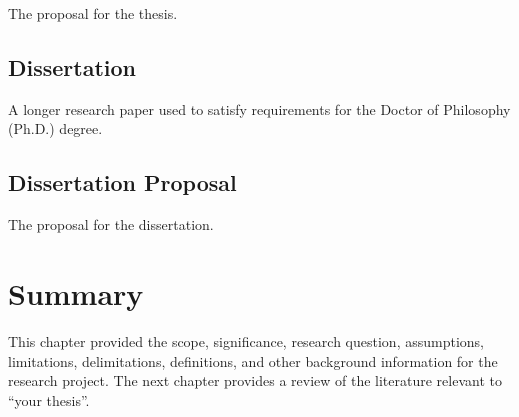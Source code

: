 The proposal for the thesis.


\subsection{Dissertation}

A longer research paper used to satisfy requirements for the Doctor of Philosophy (Ph.D.) degree.


\subsection{Dissertation Proposal}

The proposal for the dissertation.


\section{Summary}

This chapter provided the scope, significance, research question, assumptions, limitations, delimitations, definitions, and other background information for the research project.
The next chapter provides a review of the literature relevant to ``your thesis''.

